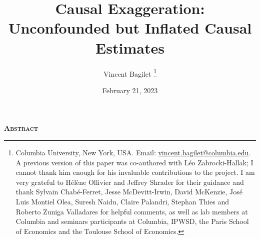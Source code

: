 \documentclass[usletter, 12pt]{article}
\begin{document}

	
	\title{Causal Exaggeration:\\ Unconfounded but Inflated Causal Estimates}

	\author{Vincent Bagilet
		\thanks{Columbia University, New York, USA. Email: \url{vincent.bagilet@columbia.edu}. 
			A previous version of this paper was co-authored with Léo Zabrocki-Hallak; I cannot thank him enough for his invaluable contributions to the project. I am very grateful to Hélène Ollivier and Jeffrey Shrader for their guidance and thank Sylvain Chabé-Ferret, Jesse McDevitt-Irwin, David McKenzie, José Luis Montiel Olea, Suresh Naidu, Claire Palandri, Stephan Thies and Roberto Zuniga Valladares for helpful comments, as well as lab members at Columbia and seminars participants at Columbia, IPWSD, the Paris School of Economics and the Toulouse School of Economics.}
	}
	

	\date{February 21, 2023}
	
	
	\maketitle
	
	\begin{center}
		\large \textsc{\textbf{Abstract}}\\
	\end{center}
		
		
		
		
	
\end{document}
